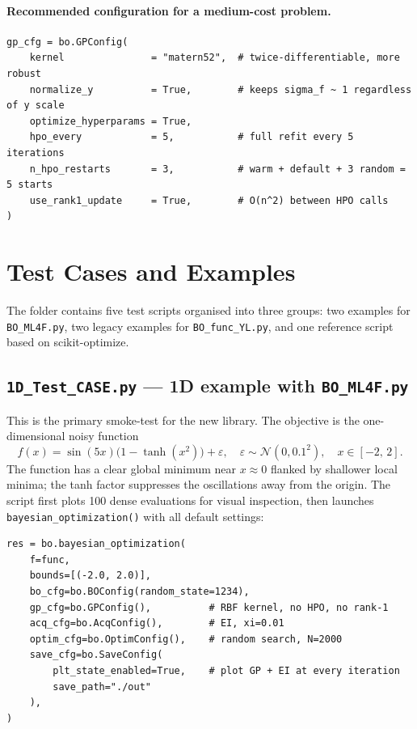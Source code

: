 \documentclass[11pt,a4paper]{article}
\newcommand{\N}{\mathcal{N}}
\theoremstyle{remark}
\newcommand{\codefile}[1]{\texttt{#1}}
\newcommand{\codefn}[1]{\texttt{#1()}}
\begin{document}
\paragraph{Recommended configuration for a medium-cost problem.}

\begin{lstlisting}[numbers=none]
gp_cfg = bo.GPConfig(
    kernel               = "matern52",  # twice-differentiable, more robust
    normalize_y          = True,        # keeps sigma_f ~ 1 regardless of y scale
    optimize_hyperparams = True,
    hpo_every            = 5,           # full refit every 5 iterations
    n_hpo_restarts       = 3,           # warm + default + 3 random = 5 starts
    use_rank1_update     = True,        # O(n^2) between HPO calls
)
\end{lstlisting}

\section{Test Cases and Examples}
\label{sec:examples}

The folder contains five test scripts organised into three groups:
two examples for \codefile{BO\_ML4F.py}, two legacy examples for
\codefile{BO\_func\_YL.py}, and one reference script based on
scikit-optimize.

\subsection{\texttt{1D\_Test\_CASE.py} --- 1D example with \codefile{BO\_ML4F.py}}
\label{sec:ex1d}

This is the primary smoke-test for the new library.  The objective is the
one-dimensional noisy function
\begin{equation}
  \label{eq:f1d}
  f(x) = \sin(5x)\bigl(1 - \tanh(x^2)\bigr) + \varepsilon,
  \quad \varepsilon \sim \N(0, 0.1^2),
  \quad x \in [-2,\, 2].
\end{equation}
The function has a clear global minimum near $x \approx 0$ flanked by
shallower local minima; the tanh factor suppresses the oscillations away
from the origin.  The script first plots 100 dense evaluations for visual
inspection, then launches \codefn{bayesian\_optimization} with all default
settings:

\begin{lstlisting}[numbers=none, caption=\codefile{1D\_Test\_CASE.py} --- key call]
res = bo.bayesian_optimization(
    f=func,
    bounds=[(-2.0, 2.0)],
    bo_cfg=bo.BOConfig(random_state=1234),
    gp_cfg=bo.GPConfig(),          # RBF kernel, no HPO, no rank-1
    acq_cfg=bo.AcqConfig(),        # EI, xi=0.01
    optim_cfg=bo.OptimConfig(),    # random search, N=2000
    save_cfg=bo.SaveConfig(
        plt_state_enabled=True,    # plot GP + EI at every iteration
        save_path="./out"
    ),
)
\end{lstlisting}
\end{document}
